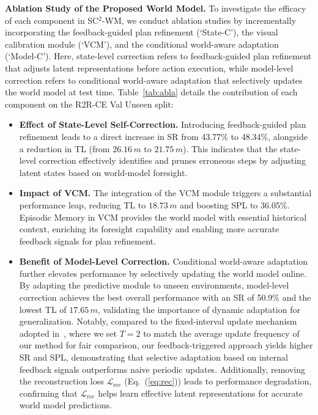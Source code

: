 \documentclass{article}
\theoremstyle{plain}
\theoremstyle{definition}
\theoremstyle{remark}
\begin{document}
\noindent\textbf{Ablation Study of the Proposed World Model.}
To investigate the efficacy of each component in SC$^{2}$-WM, we conduct ablation studies by incrementally incorporating the feedback-guided plan refinement (`State-C'), the visual calibration module (`VCM'), and the conditional world-aware adaptation (`Model-C'). Here, state-level correction refers to feedback-guided plan refinement that adjusts latent representations before action execution, while model-level correction refers to conditional world-aware adaptation that selectively updates the world model at test time. Table~\ref{tab:abla} details the contribution of each component on the R2R-CE Val Unseen split:
\begin{itemize}
    \item \textbf{Effect of State-Level Self-Correction.} Introducing feedback-guided plan refinement leads to a direct increase in SR from 43.77\% to 48.34\%, alongside a reduction in TL (from $26.16\,m$ to $21.75\,m$). This indicates that the state-level correction effectively identifies and prunes erroneous steps by adjusting latent states based on world-model foresight.
    \item \textbf{Impact of VCM.} The integration of the VCM module triggers a substantial performance leap, reducing TL to $18.73\,m$ and boosting SPL to 36.05\%. Episodic Memory in VCM provides the world model with essential historical context, enriching its foresight capability and enabling more accurate feedback signals for plan refinement.
    \item \textbf{Benefit of Model-Level Correction.} Conditional world-aware adaptation further elevates performance by selectively updating the world model online.
    By adapting the predictive module to unseen environments, model-level correction achieves the best overall performance with an SR of 50.9\% and the lowest TL of $17.65\,m$, validating the importance of dynamic adaptation for generalization. 
    Notably, compared to the fixed-interval update mechanism adopted in~\cite{gao2024fast}, where we set $T=2$ to match the average update frequency of our method for fair comparison, our feedback-triggered approach yields higher SR and SPL, demonstrating that selective adaptation based on internal feedback signals outperforms naive periodic updates.
    Additionally, removing the reconstruction loss $\mathcal{L}_{\mathrm{rec}}$ (Eq.~(\ref{eq:rec})) leads to performance degradation, confirming that $\mathcal{L}_{\mathrm{rec}}$ helps learn effective latent representations for accurate world model predictions.
\end{itemize}
\end{document}
